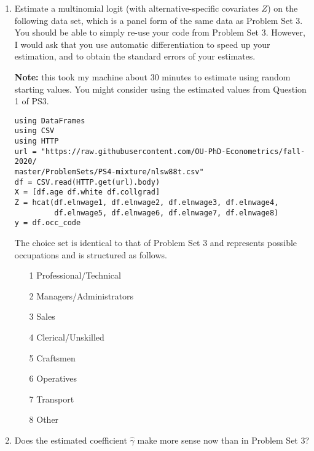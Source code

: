 \documentclass[12pt,english]{article}
\begin{document}
\begin{enumerate}
\item Estimate a multinomial logit (with alternative-specific covariates $Z$) on the following data set, which is a panel form of the same data as Problem Set 3. You should be able to simply re-use your code from Problem Set 3. However, I would ask that you use automatic differentiation to speed up your estimation, and to obtain the standard errors of your estimates.

\textbf{Note:} this took my machine about 30 minutes to estimate using random starting values. You might consider using the estimated values from Question 1 of PS3.

\begin{verbatim}
using DataFrames
using CSV
using HTTP
url = "https://raw.githubusercontent.com/OU-PhD-Econometrics/fall-2020/
master/ProblemSets/PS4-mixture/nlsw88t.csv"
df = CSV.read(HTTP.get(url).body)
X = [df.age df.white df.collgrad]
Z = hcat(df.elnwage1, df.elnwage2, df.elnwage3, df.elnwage4, 
         df.elnwage5, df.elnwage6, df.elnwage7, df.elnwage8)
y = df.occ_code
\end{verbatim}

The choice set is identical to that of Problem Set 3 and represents possible occupations and is structured  as follows.

\begin{enumerate}
    \item[1] Professional/Technical 
    \item[2] Managers/Administrators
    \item[3] Sales                  
    \item[4] Clerical/Unskilled     
    \item[5] Craftsmen              
    \item[6] Operatives             
    \item[7] Transport              
    \item[8] Other                  
\end{enumerate}

\item Does the estimated coefficient $\hat{\gamma}$ make more sense now than in Problem Set 3?


\end{enumerate}
\end{document}
